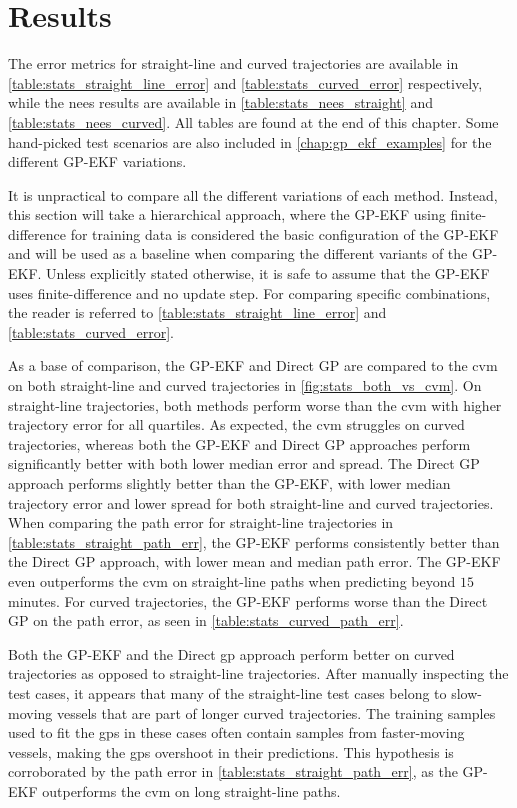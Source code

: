 \section{Results}
The error metrics for straight-line and curved trajectories are available in \cref{table:stats_straight_line_error} and \cref{table:stats_curved_error} respectively, while the \acrshort{nees} results are available in \cref{table:stats_nees_straight} and \cref{table:stats_nees_curved}. All tables are found at the end of this chapter. Some hand-picked test scenarios are also included in \cref{chap:gp_ekf_examples} for the different GP-EKF variations.

It is unpractical to compare all the different variations of each method. Instead, this section will take a hierarchical approach, where the GP-EKF using finite-difference for training data is considered the basic configuration of the GP-EKF and will be used as a baseline when comparing the different variants of the GP-EKF. Unless explicitly stated otherwise, it is safe to assume that the GP-EKF uses finite-difference and no update step. For comparing specific combinations, the reader is referred to \cref{table:stats_straight_line_error} and \cref{table:stats_curved_error}.

As a base of comparison, the GP-EKF and Direct GP are compared to the \acrshort{cvm} on both straight-line and curved trajectories in \cref{fig:stats_both_vs_cvm}. On straight-line trajectories, both methods perform worse than the \acrshort{cvm} with higher trajectory error for all quartiles. As expected, the \acrshort{cvm} struggles on curved trajectories, whereas both the GP-EKF and Direct GP approaches perform significantly better with both lower median error and spread. The Direct GP approach performs slightly better than the GP-EKF, with lower median trajectory error and lower spread for both straight-line and curved trajectories. When comparing the path error for straight-line trajectories in \cref{table:stats_straight_path_err}, the GP-EKF performs consistently better than the Direct GP approach, with lower mean and median path error. The GP-EKF even outperforms the \acrshort{cvm} on straight-line paths when predicting beyond $15$ minutes. For curved trajectories, the GP-EKF performs worse than the Direct GP on the path error, as seen in \cref{table:stats_curved_path_err}.

Both the GP-EKF and the Direct \acrshort{gp} approach perform better on curved trajectories as opposed to straight-line trajectories. After manually inspecting the test cases, it appears that many of the straight-line test cases belong to slow-moving vessels that are part of longer curved trajectories.  The training samples used to fit the \acrshort{gp}s in these cases often contain samples from faster-moving vessels, making the \acrshort{gp}s overshoot in their predictions. This hypothesis is corroborated by the path error in \cref{table:stats_straight_path_err}, as the GP-EKF outperforms the \acrshort{cvm} on long straight-line paths.

